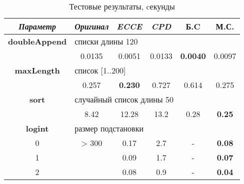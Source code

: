 \begin{table}[h!]
\center
\begin{tabular}{|c|c|c|c|c|c|}
\hline
{\it Параметр} & {\it Оригинал} & {\it ECCE }  & {\it CPD} & {\bf Б.C} & {\bf М.С.} \\ \hline
{\bf doubleAppend} & \multicolumn{5}{|l|}{списки длины 120 } \\ \hline
                   & 0.0135 & 0.0051 & 0.0133 & {\bf 0.0040} & 0.0097 \\ \hline


{\bf maxLength} & \multicolumn{5}{|l|}{список [1..200]} \\ \hline

                & 0.257 & {\bf 0.230} & 0.727 & 0.614 & 0.275 \\ \hline


{\bf sort} & \multicolumn{5}{|l|}{случайный список длины 50 } \\ \hline
         & 8.42     & 12.28 & 13.2 & 0.28  & {\bf 0.25} \\ \hline


{\bf logint} & \multicolumn{5}{|l|}{размер подстановки} \\ \hline
0 & > 300    & 0.17  & 2.7  & -  &  {\bf 0.08} \\
1 &          & 0.09  & 1.7  & -  &  {\bf 0.07} \\
2 &          & 0.08   & 0.9  & -  & {\bf 0.04} \\
\hline

\end{tabular}
\caption{Тестовые результаты, cекунды}
\label{fig:totalResult}
\end{table}


